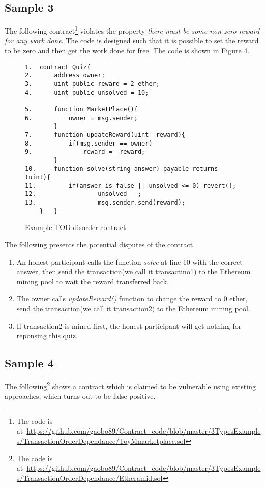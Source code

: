 \documentclass[sigconf,review,anonymous]{acmart}
\begin{document}
\subsection{Sample 3} The following contract\footnote{The code is at~\url{https://github.com/gaobo89/Contract_code/blob/master/3TypesExamples/TransactionOrderDependance/ToyMmarketplace.sol}} violates the property \emph{there must be some non-zero reward for any work done}. The code is designed such that it is possible to set the reward to be zero and then get the work done for free. The code is shown in Figure 4.

\begin{figure}	
	{\footnotesize
	\begin{verbatim}
1.	contract Quiz{
2.	    address owner;
3.	    uint public reward = 2 ether;
4.	    uint public unsolved = 10;

5.	    function MarketPlace(){
6.	        owner = msg.sender;		
	    }
7.	    function updateReward(uint _reward){
8.	        if(msg.sender == owner)
9.	            reward = _reward;
	    }
10.	    function solve(string answer) payable returns (uint){
11.	        if(answer is false || unsolved <= 0) revert();
12.       	        unsolved --;
13.       	        msg.sender.send(reward);
	}   }   

	\end{verbatim} }
\caption{Example TOD disorder contract}
\label{Sample 3}
\end{figure}
	
The following presents the potential disputes of the contract.
\begin{enumerate}

    \item An honest participant calls the function \emph{solve} at line 10 with the correct answer, then send the transaction(we call it transactino1) to the Ethereum mining pool to wait the reward transferred back.

    \item The owner calls \emph{updateReward()} function to change the reward to 0 ether, send the transaction(we call it transaction2) to the Ethereum mining pool.

    \item If transaction2 is mined first, the honest participant will get nothing for reponsing this quiz.

\end{enumerate}

\subsection{Sample 4} The following\footnote{The code is at~\url{https://github.com/gaobo89/Contract_code/blob/master/3TypesExamples/TransactionOrderDependance/Etheramid.sol}} shows a contract which is claimed to be vulnerable using existing approaches, which turns out to be false positive.
\end{document}
